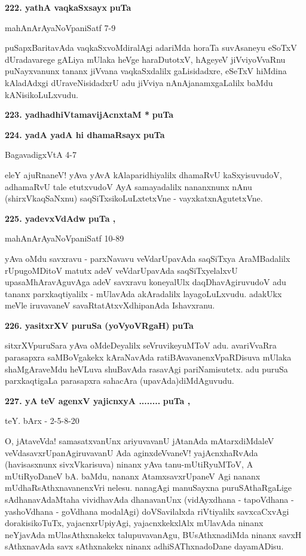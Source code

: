 \medskip
\noindent
\textbf{222. yathA vaqkaSxsayx} \hfill{\bf puTa \pageref{121}}

\hfill{mahAnArAyaNoVpaniSatf 7-9}

\smallskip
puSapxBaritavAda vaqkaSxvoMdiralAgi adariMda horaTa suvAsaneyu \hbox{eSoTxV} dUradavarege gALiya mUlaka heVge haraDutotxV, hAgeyeV jiVviyoVvaRnu puNayxvanunx tananx jiVvana vaqkaSxdalilx gaLisidadxre, eSeTxV hiMdina kAladAdxgi dUraveNi\-sidadxrU adu jiVviya nAnAjanamxgaLalilx baMdu kANisikoLuLxvudu.

\medskip
\noindent
\textbf{223. yadhadhiVtamavijAcnxtaM *} \hfill{\bf puTa \pageref{39}}

\medskip
\noindent
\textbf{224. yadA yadA hi dhamaRsayx} \hfill{\bf puTa \pageref{71}}

\hfill{BagavadigxVtA 4-7}

\smallskip
eleY ajuRnaneV! yAva yAvA kAlaparidhiyalilx dhamaRvU kaSxyisu\-vudoV, adhamaRvU tale etutxvudoV AyA samayadalilx nananxnunx nAnu (shirxVkaqSaNxnu) saqSiTxsikoLuLxtetxVne - vayxkatxnAgutetxVne.

\medskip
\noindent
\textbf{225. yadevxVdAdw} \hfill{\bf puTa \pageref{102}, \pageref{138}}

\hfill{mahAnArAyaNoVpaniSatf 10-89}

\smallskip
yAva oMdu savxravu - parxNavavu veVdarUpavAda saqSiTxya AraMBadalilx rUpugoMDitoV matutx adeV veVdarUpavAda saqSiTxyelalxvU upasaMhAravAguvAga adeV savxravu koneyalUlx daqDhavAgiru\-vudoV adu tananx parxkaqtiyalilx - mUla\-vAda akAradalilx layagoLuLxvudu. adakUkx meVle iruvavaneV savaRtatAtxvX\-dhipa\-nAda Ishavxranu.

\eject

\noindent
\textbf{226. yasitxrXV puruSa (yoVyoVRgaH)} \hfill{\bf puTa \pageref{227}}

\smallskip
sitxrXVpuruSara yAva oMdeDeyalilx seVruvikeyuMToV adu. avariVvaRra parasapxra saMBoV\-gakekx kAraNavAda ratiBAvavanenxVpaRDisuva mUlaka shaMgAraveMdu heVLuva shuBavAda rasavAgi pari\-Nami\-sutetx. adu puruSa parxkaqtigaLa parasapxra saha\-cAra (upavAda)diMdAguvudu.

\medskip
\noindent
\textbf{227. yA teV agenxV yajicnxyA ........} \hfill{\bf puTa \pageref{116}, \pageref{211}}

\hfill{teY. bArx - 2-5-8-20}

\smallskip
O, jAtaveVda! samasatxvanUnx ariyuvavanU jAtanAda mAtarxdiMdaleV veVdasavxrUpanAgiru\-va\-vanU Ada aginxdeVvaneV! yajAcnxhaRvAda (havisasxnunx sivxVkarisuva) ninanx yAva tanu-mUtiR\-yuMToV, A mUtiRyoDaneV bA. baMdu, nananx AtamxsavxrUpaneV Agi nananx mUdhaRsAthxnavanenxVri nelesu. nana\-gAgi manuSayxna puruSAthaRgaLige sAdhanavAdaMtaha vividhavAda dhanavanUnx (vidAyxdhana - tapoV\-dhana - yashoVdhana - goVdhana modalAgi) doVSavilalxda riVtiyalilx savxcaCxvAgi dorakisikoTuTx, yajacnx\-rUpi\-yAgi, yajacnxkekxlAlx mUlavAda ninanx neYjavAda mUlasAthxnakekx talupuvavanAgu, BUsAthxna\-diMda ninanx savxH sAthxnavAda savx sAthxnakekx ninanx adhiSAThxnadoDane dayamADisu.

